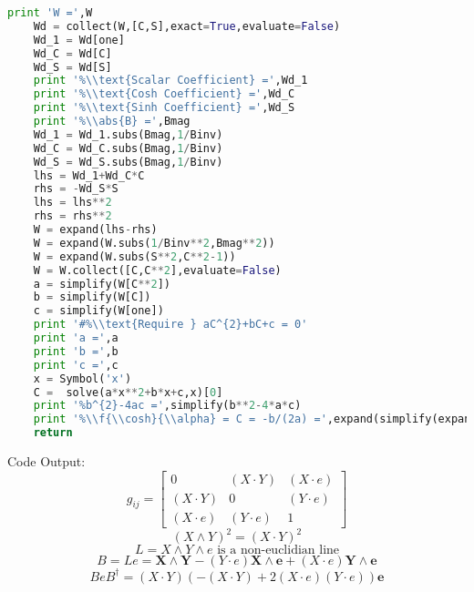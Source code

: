 \documentclass[10pt,fleqn]{report}
\newcommand{\lp}{\left (}
\newcommand{\rp}{\right )}
\newcommand{\abs}[1]{\left |{#1}\right | }
\newcommand{\W}{\wedge}
\newcommand{\f}[2]{{#1}\lp{#2}\rp}
\begin{document}
\begin{lstlisting}[language=Python,showspaces=false,showstringspaces=false,backgroundcolor=\color{gray},frame=single]
    print 'W =',W
    Wd = collect(W,[C,S],exact=True,evaluate=False)
    Wd_1 = Wd[one]
    Wd_C = Wd[C]
    Wd_S = Wd[S]
    print '%\\text{Scalar Coefficient} =',Wd_1
    print '%\\text{Cosh Coefficient} =',Wd_C
    print '%\\text{Sinh Coefficient} =',Wd_S
    print '%\\abs{B} =',Bmag
    Wd_1 = Wd_1.subs(Bmag,1/Binv)
    Wd_C = Wd_C.subs(Bmag,1/Binv)
    Wd_S = Wd_S.subs(Bmag,1/Binv)
    lhs = Wd_1+Wd_C*C
    rhs = -Wd_S*S
    lhs = lhs**2
    rhs = rhs**2
    W = expand(lhs-rhs)
    W = expand(W.subs(1/Binv**2,Bmag**2))
    W = expand(W.subs(S**2,C**2-1))
    W = W.collect([C,C**2],evaluate=False)
    a = simplify(W[C**2])
    b = simplify(W[C])
    c = simplify(W[one])
    print '#%\\text{Require } aC^{2}+bC+c = 0'
    print 'a =',a
    print 'b =',b
    print 'c =',c
    x = Symbol('x')
    C =  solve(a*x**2+b*x+c,x)[0]
    print '%b^{2}-4ac =',simplify(b**2-4*a*c)
    print '%\\f{\\cosh}{\\alpha} = C = -b/(2a) =',expand(simplify(expand(C)))
    return
\end{lstlisting}
Code Output:
\begin{equation*} g_{ij} = \left[\begin{matrix}0 & \left ( X\cdot Y\right )  & \left ( X\cdot e\right ) \\\left ( X\cdot Y\right )  & 0 & \left ( Y\cdot e\right ) \\\left ( X\cdot e\right )  & \left ( Y\cdot e\right )  & 1\end{matrix}\right] \end{equation*}
\begin{equation*} (X\W Y)^{2} = \left ( X\cdot Y\right ) ^{2} \end{equation*}
\begin{equation*} L = X\W Y\W e \text{ is a non-euclidian line} \end{equation*}
\begin{equation*} B = L e =  \boldsymbol{X\wedge Y} - \left ( Y\cdot e\right )  \boldsymbol{X\wedge e} + \left ( X\cdot e\right )  \boldsymbol{Y\wedge e} \end{equation*}
\begin{equation*} BeB^{\dagger} = \left ( X\cdot Y\right )  \left(- \left ( X\cdot Y\right )  + 2 \left ( X\cdot e\right )  \left ( Y\cdot e\right ) \right) \boldsymbol{e} \end{equation*}
\end{document}
